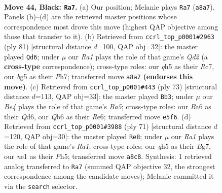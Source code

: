 \documentclass[11pt]{article}
\begin{document}
\clearpage

\begin{figure}[p]\centering
\begin{subfigure}{0.46\textwidth}\centering
\resizebox{\linewidth}{!}{%
\newchessgame
\chessboard[
  setfen={r4k2/7p/bq2p3/p2pbpBQ/P1np3P/8/5P2/RNR1N1K1 b - - 9 44},
  showmover=false,
  pgfstyle=straightmove, color=movearrow, markmove={a8-a7}
]}
\caption{}
\end{subfigure}\hfill
\begin{subfigure}{0.46\textwidth}\centering
\resizebox{\linewidth}{!}{%
\newchessgame
\chessboard[
  setfen={8/p1rq2kp/1p2bp2/3p2p1/3P1nP1/P3R1NP/1P3P1K/4QB2 b - - 3 41},
  showmover=false,
  pgfstyle=straightmove, color=movearrow, markmove={d7-d6}
]}
\caption{}
\end{subfigure}
\\[4pt]
\begin{subfigure}{0.46\textwidth}\centering
\resizebox{\linewidth}{!}{%
\newchessgame
\chessboard[
  setfen={6k1/7p/1p1qr1p1/p1np4/b7/P1Q2P1P/5BP1/2R2B1K b - - 6 37},
  showmover=false,
  pgfstyle=straightmove, color=movearrow, markmove={a4-b3}
]}
\caption{}
\end{subfigure}\hfill
\begin{subfigure}{0.46\textwidth}\centering
\resizebox{\linewidth}{!}{%
\newchessgame
\chessboard[
  setfen={r5k1/1p3pb1/6p1/1PpPP1np/6bq/1Q1B4/2NB2PP/4R1K1 b - - 2 36},
  showmover=false,
  pgfstyle=straightmove, color=movearrow, markmove={a8-e8}
]}
\caption{}
\end{subfigure}
\caption{\textbf{Move 44, Black: \texttt{Ra7}.} (a) Our position; Melanie plays \texttt{Ra7} (\texttt{a8a7}). Panels (b)--(d) are the retrieved master positions whose correspondence most drove this move (highest QAP objective among those that transfer to it). (b) Retrieved from \texttt{ccrl\_top\_p0001\#2963} (ply 81) [structural distance $d$=100, QAP obj=32]: the master played \texttt{Qd6}; under $\mu$ our \emph{Ra1} plays the role of that game's \emph{Qd2} (a \textbf{cross-type} correspondence); cross-type roles: our \emph{q}h5 as their \emph{R}c7, our \emph{b}g5 as their \emph{P}h7; transferred move \texttt{a8a7} \textbf{(endorses this move)}. (c) Retrieved from \texttt{ccrl\_top\_p0001\#443} (ply 73) [structural distance $d$=113, QAP obj=33]: the master played \texttt{Bb3}; under $\mu$ our \emph{Be4} plays the role of that game's \emph{Ba5}; cross-type roles: our \emph{B}a6 as their \emph{Q}d6, our \emph{Q}b6 as their \emph{R}e6; transferred move \texttt{e5f6}. (d) Retrieved from \texttt{ccrl\_top\_p0001\#3988} (ply 71) [structural distance $d$=120, QAP obj=30]: the master played \texttt{Re8}; under $\mu$ our \emph{Ra1} plays the role of that game's \emph{Ra1}; cross-type roles: our \emph{q}h5 as their \emph{B}g7, our \emph{n}e1 as their \emph{P}h5; transferred move \texttt{a8c8}. Synthesis: 1 retrieved analog transferred to \texttt{Ra7} (summed QAP objective 32, the strongest correspondence among the candidate moves); Melanie committed it via the \texttt{search} selector.}
\label{fig:thought-m87}
\end{figure}
\end{document}
